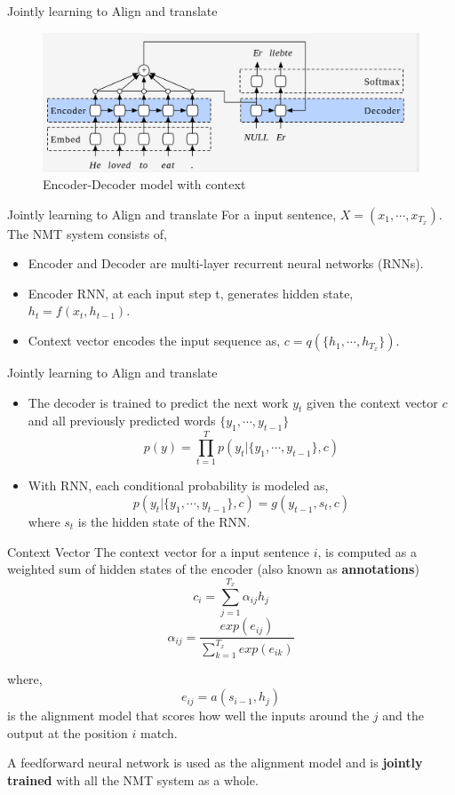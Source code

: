﻿\documentclass[aspectratio=43,mathserif,xcolor={usenames,dvipsnames,svgnames,table},10pt]{beamer}
\begin{document}
\begin{frame}{Jointly learning to Align and translate}
\begin{figure}[h]
    \includegraphics[width=0.9\linewidth]{images/context.png}  
    \caption{Encoder-Decoder model with context}
  \end{figure}
\end{frame}

\begin{frame}{Jointly learning to Align and translate}
For a input sentence, $X = (x_1,\cdots, x_{T_{x}} )$. The NMT 
system consists of,
  \begin{itemize}
   \item Encoder and Decoder are multi-layer recurrent neural networks (RNNs).
   \item Encoder RNN, at each input step t, generates hidden state, $h_t = f(x_t, h_{t-1})$.
   \item Context vector encodes the input sequence as, $c = q(\{h_1,\cdots,h_{T_x}\})$.
  \end{itemize}
\end{frame}

\begin{frame}{Jointly learning to Align and translate}
\begin{itemize}
 \item The decoder is trained to predict the next work $y_t$ given the context vector $c$ and all previously predicted words $\{ y_1, \cdots, y_{t-1}\}$
 $$ p(y) = \prod^{T}_{t=1} p(y_t | \{ y_1, \cdots, y_{t-1}\} ,c ) $$
 \item With RNN, each conditional probability is modeled as,
 $$ p(y_t | \{ y_1, \cdots, y_{t-1}\}, c) = g(y_{t-1}, s_t, c) $$ where $s_t$ is the hidden state of the RNN.
 \end{itemize}

\end{frame}


\begin{frame}{Context Vector}
  The context vector for a input sentence $i$, is computed as a weighted sum of hidden states of the encoder (also known as \textbf{annotations})
  $$ c_i = \sum_{j=1}^{T_{x}} \alpha_{ij} h_j$$
  $$ \alpha_{ij} = \frac{ exp(e_{ij})}{ \sum_{k=1}^{T_x} exp (e_{ik})}$$

where,
$$ e_{ij} = a(s_{i-1}, h_j)  $$ is the alignment model that scores how well the inputs around the $j$ and the output at the position $i$ match.

A feedforward neural network is used as the alignment model and is \textbf{jointly trained} with all the NMT system as a whole.
\end{frame}
\end{document}
